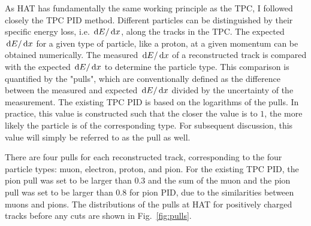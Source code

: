           As HAT has fundamentally the same working principle as the TPC, I followed closely the TPC PID method.
          Different particles can be distinguished by their specific energy loss, i.e. $\,\textrm{d}E/\,\textrm{d}x$, along the tracks in the TPC.
          The expected $\,\textrm{d}E/\,\textrm{d}x$ for a given type of particle, like a proton, at a given momentum can be obtained numerically.
          The measured $\,\textrm{d}E/\,\textrm{d}x$ of a reconstructed track is compared with the expected $\,\textrm{d}E/\,\textrm{d}x$ to determine the particle type.
          This comparison is quantified by the "pulls", which are conventionally defined as the difference between the measured and expected $\,\textrm{d}E/\,\textrm{d}x$ divided by the uncertainty of the measurement.
          The existing TPC PID is based on the logarithms of the pulls. 
          In practice, this value is constructed such that the closer the value is to $1$, the more likely the particle is of the corresponding type.
          For subsequent discussion, this value will simply be referred to as the pull as well.

          There are four pulls for each reconstructed track, corresponding to the four particle types: muon, electron, proton, and pion.
          For the existing TPC PID, the pion pull was set to be larger than $0.3$ and the sum of the muon and the pion pull was set to be larger than $0.8$ for pion PID, due to the similarities between muons and pions.
          The distributions of the pulls at HAT for positively charged tracks before any cuts are shown in Fig.~\ref{fig:pulls}.

